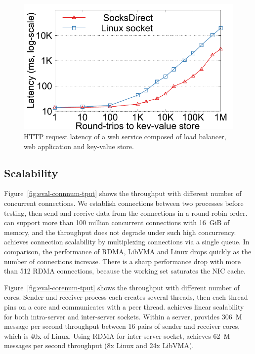 \begin{figure}[t!]
\begin{minipage}{.31\textwidth}
		\centering \includegraphics[width=\textwidth]{eval/microbenchmark/nginx-multiround-tput.pdf}
		\vspace{-15pt}
		\caption{HTTP request latency of a web service composed of load balancer, web application and key-value store.}
		\label{fig:eval-nginx-multiround}
	\end{minipage}
\end{figure}

\subsection{Scalability}


Figure~\ref{fig:eval-connnum-tput} shows the throughput with different number of concurrent connections.
We establish connections between two processes before testing, then send and receive data from the connections in a round-robin order.
\sys can support more than 100 million concurrent connections with 16~GiB of memory, and the throughput does not degrade under such high concurrency.
\sys achieves connection scalability by multiplexing connections via a single queue.
In comparison, the performance of RDMA, LibVMA and Linux drops quickly as the number of connections increase. There is a sharp performance drop with more than 512 RDMA connections, because the working set saturates the NIC cache.




Figure~\ref{fig:eval-corenum-tput} shows the throughput with different number of cores.
Sender and receiver process each creates several threads, then each thread pins on a core and communicates with a peer thread.
\sys achieves linear scalability for both intra-server and inter-server sockets.
Within a server, \sys provides 306~M message per second throughput between 16 pairs of sender and receiver cores, which is 40x of Linux.
Using RDMA for inter-server socket, \sys achieves 62~M messages per second throughput (8x Linux and 24x LibVMA).

